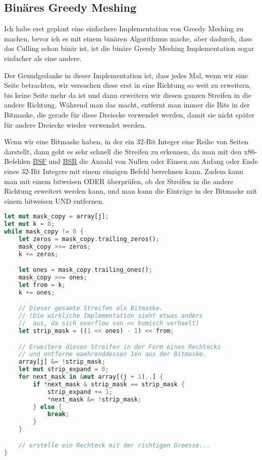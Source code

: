 \subsection{Binäres Greedy Meshing}

Ich habe erst geplant eine einfachere Implementation
von Greedy Meshing zu machen, bevor ich es mit
einem binären Algorithmus mache, aber dadurch,
dass das Culling schon binär ist, ist die binäre
Greedy Meshing Implementation sogar einfacher als
eine andere.

Der Grundgedanke in dieser Implementation ist,
dass jedes Mal, wenn wir eine Seite betrachten,
wir versuchen diese erst in eine Richtung so weit
zu erweitern, bis keine Seite mehr da ist und dann
erweitern wir diesen ganzen Streifen in die andere
Richtung.
Während man das macht, entfernt man immer die
Bits in der Bitmaske, die gerade für diese Dreiecke
verwendet werden, damit sie nicht später für andere
Dreiecke wieder verwendet werden.


Wenn wir eine Bitmaske haben, in der ein
32-Bit Integer eine Reihe von Seiten darstellt,
dann geht es sehr schnell die Streifen zu erkennen,
da man mit den x86-Befehlen
\href{https://www.felixcloutier.com/x86/bsf}{BSF} \cite{bsf}
und
\href{https://www.felixcloutier.com/x86/bsr}{BSR} \cite{bsr}
die Anzahl von Nullen oder Einsen am Anfang oder
Ende eines 32-Bit Integers mit einem einzigen
Befehl berechnen kann.
Zudem kann man mit einem bitweisen ODER
überprüfen, ob der Streifen in die andere Richtung
erweitert werden kann, und man kann die Einträge
in der Bitmaske mit einem bitweisen UND entfernen.

\begin{lstlisting}[language=Rust]
let mut mask_copy = array[j];
let mut k = 0;
while mask_copy != 0 {
	let zeros = mask_copy.trailing_zeros();
	mask_copy >>= zeros;
	k += zeros;

	let ones = mask_copy.trailing_ones();
	mask_copy >>= ones;
	let from = k;
	k += ones;

	// Dieser gesamte Streifen als Bitmaske.
	// (Die wirkliche Implementation sieht etwas anders
	//  aus, da sich overflow von << komisch verhaelt)
	let strip_mask = ((1 << ones) - 1) << from;

	// Erweitere diesen Streifen in der Form eines Rechtecks
	// und entferne waehrenddessen 1en aus der Bitmaske.
	array[j] &= !strip_mask;
	let mut strip_expand = 0;
	for next_mask in &mut array[(j + 1)..] {
		if *next_mask & strip_mask == strip_mask {
			strip_expand += 1;
			*next_mask &= !strip_mask;
		} else {
			break;
		}
	}

	// erstelle ein Rechteck mit der richtigen Groesse...
}
\end{lstlisting}

